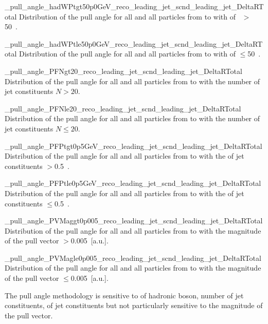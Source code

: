      {_pull_angle_hadWPtgt50p0GeV_reco_leading_jet_scnd_leading_jet_DeltaRTotal}
     {Distribution of the pull angle for all \DeltaR and all particles from \leadingjet to \scndleadingjet with \pt of \PW\ $>$50~\GeV.}

     {_pull_angle_hadWPtle50p0GeV_reco_leading_jet_scnd_leading_jet_DeltaRTotal}
     {Distribution of the pull angle for all \DeltaR and all particles from \leadingjet to \scndleadingjet with \pt of \PW $\leq$50~\GeV.}

     {_pull_angle_PFNgt20_reco_leading_jet_scnd_leading_jet_DeltaRTotal}
     {Distribution of the pull angle for all \DeltaR and all particles from \leadingjet to \scndleadingjet with the number of jet constituents $N>20$.}

     {_pull_angle_PFNle20_reco_leading_jet_scnd_leading_jet_DeltaRTotal}
     {Distribution of the pull angle for all \DeltaR and all particles from \leadingjet to \scndleadingjet with the number of jet constituents $N\leq20$.}

     {_pull_angle_PFPtgt0p5GeV_reco_leading_jet_scnd_leading_jet_DeltaRTotal}
     {Distribution of the pull angle for all \DeltaR and all particles from \leadingjet to \scndleadingjet with the \pt of jet constituents $>$0.5~\GeV.}

     {_pull_angle_PFPtle0p5GeV_reco_leading_jet_scnd_leading_jet_DeltaRTotal}
     {Distribution of the pull angle for all \DeltaR and all particles from \leadingjet to \scndleadingjet with the \pt of jet constituents $\leq$0.5~\GeV.}

     {_pull_angle_PVMaggt0p005_reco_leading_jet_scnd_leading_jet_DeltaRTotal}
     {Distribution of the pull angle for all \DeltaR and all particles from \leadingjet to \scndleadingjet with the magnitude of the pull vector $>$0.005~[a.u.].}

    {_pull_angle_PVMagle0p005_reco_leading_jet_scnd_leading_jet_DeltaRTotal}
    {Distribution of the pull angle for all \DeltaR and all particles from \leadingjet to \scndleadingjet with the magnitude of the pull vector $\leq$0.005~[a.u.].}

The pull angle methodology is sensitive to \pt of hadronic \PW boson, number of jet constituents, \pt of jet constituents but not particularly sensitive to the magnitude of the pull vector.

